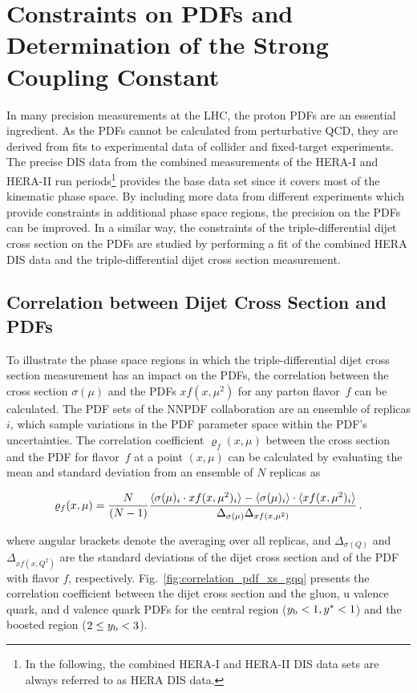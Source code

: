 \chapter{Constraints on PDFs and Determination of the Strong Coupling Constant}
\label{sec:pdf_constraints}

In many precision measurements at the LHC, the proton PDFs are an essential
ingredient. As the PDFs cannot be calculated from perturbative QCD, they are
derived from fits to experimental data of collider and fixed-target experiments.
The precise DIS data from the combined measurements of the HERA-I and HERA-II
run periods\footnote{In the following, the combined HERA-I and HERA-II DIS data sets
are always referred to as HERA DIS data.} provides the base data set since it
covers most of the kinematic phase space. By including more data from different
experiments which provide constraints in additional phase space regions, the
precision on the PDFs can be improved. In a similar way, the constraints of the
triple-differential dijet cross section on the PDFs are studied by performing a
fit of the combined HERA DIS data and the triple-differential dijet cross
section measurement.

\section{Correlation between Dijet Cross Section and PDFs}
\label{sec:pdf_sensitivity}

To illustrate the phase space regions in which the triple-differential dijet
cross section measurement has an impact on the PDFs, the correlation between the cross
section $\sigma(\mu)$ and the PDFs $xf(x,\mu^2)$ for any parton flavor~$f$ can be
calculated. The PDF sets of the NNPDF collaboration are an ensemble of replicas
$i$, which sample variations in the PDF parameter space within the PDF's
uncertainties. The correlation coefficient $\varrho_f(x,\mu)$ between the cross
section and the PDF for flavor~$f$ at a point $(x,\mu)$ can be calculated by
evaluating the mean and standard deviation from an ensemble of $N$ replicas as

\begin{equation}
  \varrho_f (x,\mu) =
  \frac{N}{(N-1)} \frac{%
    \langle \sigma(\mu)_i \cdot xf(x,\mu^2)_i \rangle -
    \langle \sigma(\mu)_i \rangle \cdot
    \langle xf(x,\mu^2)_i \rangle}
  {\Delta_{\sigma(\mu)} \Delta_{xf(x,\mu^2)}}\,.
\end{equation}

where angular brackets denote the averaging over all replicas, and
$\Delta_{\sigma(Q)}$ and $\Delta_{xf(x,Q^2)}$ are the standard deviations of the
dijet cross section and of the PDF with flavor $f$, respectively.
Fig.~\ref{fig:correlation_pdf_xs_gqq} presents the correlation coefficient
between the dijet cross section and the gluon, u valence quark, and d valence
quark PDFs for the central region ($y_{\mathrm{b}} < 1, y^* < 1$) and the
boosted region ($2 \leq y_{\mathrm{b}} < 3$).

